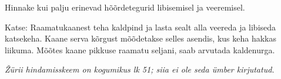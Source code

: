 
Hinnake kui palju erinevad hõõrdetegurid libisemisel ja veeremisel.

\hint

\solu
Katse: Raamatukaanest teha kaldpind ja lasta sealt alla veereda ja libiseda katsekeha. Kaane serva kõrgust mõõdetakse selles asendis, kus keha hakkas liikuma. Mõõtes kaane pikkuse raamatu seljani, saab arvutada kaldenurga.

\textit{Žürii hindamisskeem on kogumikus lk 51; siia ei ole seda ümber kirjutatud.}
\probend
